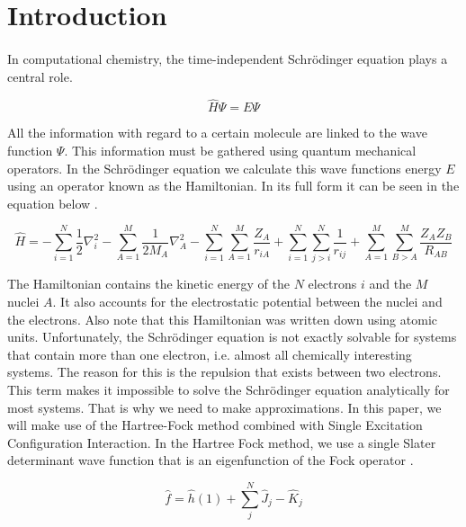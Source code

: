 \section{Introduction}

\paragraph*{}
In computational chemistry, the time-independent Schrödinger equation plays a central role.

\begin{equation}\label{eq:erwin}
  \hat{H}\Psi = E\Psi
\end{equation}

All the information with regard to a certain molecule are linked to the wave function $\Psi$.
This information must be gathered using quantum mechanical operators. In the Schrödinger equation we
calculate this wave functions energy $E$ using an operator known as the Hamiltonian. In its full form it can be seen in the equation below \cite{Szabo1996}.

\begin{equation}\label{eq:ham}
  \hat{H} = -\sum_{i=1}^N\frac{1}{2}\nabla^2_i - \sum_{A=1}^M \frac{1}{2M_A}\nabla^2_A - \sum_{i=1}^N\sum_{A=1}^M\frac{Z_A}{r_{iA}} + \sum_{i=1}^N\sum_{j>i}^N\frac{1}{r_{ij}} +
  \sum_{A=1}^M\sum_{B>A}^M\frac{Z_A Z_B}{R_{AB}}
\end{equation}

The Hamiltonian contains the kinetic energy of the $N$ electrons $i$ and the $M$ nuclei $A$. It also accounts for the electrostatic potential between the nuclei and the electrons.
Also note that this Hamiltonian was written down using atomic units. Unfortunately, the Schrödinger equation is not exactly solvable for systems that contain more than one electron, i.e.
almost all chemically interesting systems. The reason for this is the repulsion that exists between two electrons. This term makes it impossible to solve the Schrödinger equation
analytically for most systems. That is why we need to make approximations. In this paper, we will make use of the Hartree-Fock method
combined with Single Excitation Configuration Interaction. In the Hartree Fock method, we use a single Slater determinant wave function that is an eigenfunction of the Fock
operator \cite{Szabo1996}.

\begin{equation}
  \hat{f} = \hat{h}(1) +  \sum_j^N \hat{J}_j - \hat{K}_j
\end{equation}

